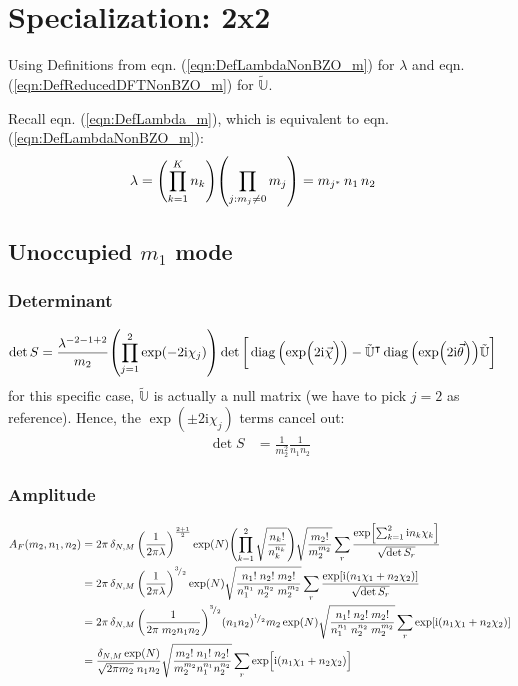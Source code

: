 \documentclass[
	english,
	a4paper,
	fontsize=10pt,
	parskip=half,
	titlepage=true,
	DIV=12,
	final
]{scrreprt}
\newcommand*{\smallfrac}  [2]{\ensuremath{{}^        {#1} \!/_        {#2}}}
\newcommand*{\transp}{\ensuremath{^\intercal}}
\newcommand*{\iunit}{\ensuremath{\mathrm{i}}}
\DeclareMathOperator{\diag}{diag}
\begin{document}
\section{Specialization: 2x2}
Using Definitions from eqn. (\ref{eqn:DefLambdaNonBZO_m}) for $\lambda$ and eqn. (\ref{eqn:DefReducedDFTNonBZO_m}) for $\tilde{\mathbb{U}}$.

Recall eqn. (\ref{eqn:DefLambda_m}), which is equivalent to eqn. (\ref{eqn:DefLambdaNonBZO_m}):
\begin{align*}
	\lambda
&=
	\qty( \prod_{k=1}^{K}   n_k )
	\qty( \prod_{j : m_j \neq 0} m_j )
=
	m_{j^*} \, n_1 \, n_2
\end{align*}

\subsection{Unoccupied $m_1$ mode}
\subsubsection{Determinant}
\begin{align}
	\det S
&=
	\frac{ \lambda^{-2 - 1 + 2} }{ m_2 }
	\qty( \prod_{j=1}^{2} \exp(-2\iunit \chi_j) )
	\det\qty[\bigg.
		\diag\qty(\exp(\Big.2\iunit\vec{\chi}))
		-
		\tilde{\mathbb{U}}\transp
		\diag\qty(\exp(2\iunit\vec{\theta}))
		\tilde{\mathbb{U}}
	]
\end{align}
for this specific case, $\tilde{\mathbb{U}}$ is actually a null matrix (we have to pick $j=2$ as reference). Hence, the 
$\exp(\pm 2\iunit \chi_j)$ terms cancel out:
\begin{align}
	\det S
&=
	\frac{1}{m_2^{2}}
	\frac{1}{n_1 n_2}
\end{align}

\subsubsection{Amplitude}
\begin{align}
	A_F(m_2, n_1, n_2)
&=
	2\pi \, \delta_{N,M} \, \qty(
		\frac{1}{2\pi\lambda}
	)^{\frac{2 + 1}{2}}
	\exp(N)
	\qty( \prod_{k=1}^{2}
		\sqrt{\frac
			{ n_k! }
			{ n_k^{n_k} }
	})
		\sqrt{\frac
			{ m_2! }
			{ m_2^{m_2} }
	}
	\sum_r
		\frac
		{\exp[ \sum_{k=1}^{2} \iunit n_k \chi_k]}
		{\sqrt{\det S_r}} \\
&=
	2\pi \, \delta_{N,M} \, \qty(
		\frac{1}{2\pi\lambda}
	)^{\smallfrac{3}{2}}
	\exp(N)
		\sqrt{\frac
			{ n_1! \; n_2! \; m_2! }
			{ n_1^{n_1} \; n_2^{n_2} \; m_2^{m_2}}
	}
	\sum_r
		\frac
		{\exp[
			\iunit ( n_1 \chi_1 + n_2 \chi_2 )
		]}
		{\sqrt{\det S_r}}
	\\
&=
	2\pi \, \delta_{N,M} \, \qty(
		\frac{1}{2\pi \; m_2 n_1 n_2}
	)^{\smallfrac{3}{2}}
	(n_1 n_2)^{\smallfrac{1}{2}} m_2
	\exp(N)
	\sqrt{\frac
		{ n_1! \; n_2! \; m_2! }
		{ n_1^{n_1} \; n_2^{n_2} \; m_2^{m_2}}
	}
	\sum_r
		\exp[
			\iunit ( n_1 \chi_1 + n_2 \chi_2 )
		] \\
&=
	\frac
		{ \delta_{N,M} \exp(N) }
		{ \sqrt{2\pi m_2} \; n_1 n_2 }
	\sqrt{\frac
		{ m_2! \; n_1! \; n_2! }
		{ m_2^{m_2} n_1^{n_1} n_2^{n_2} }
	}
	\sum_r
		\exp[ \Big.
			\iunit \qty(  
			n_1 \chi_1 + n_2 \chi_2)
		]
\end{align}
\end{document}
